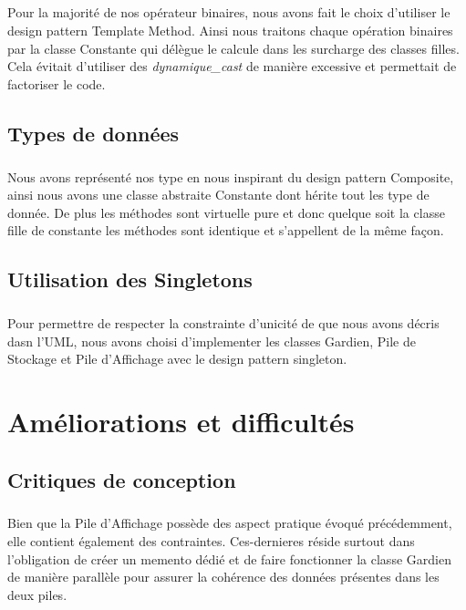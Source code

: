 \documentclass[a4paper,12pt]{report}
\begin{document}
			\paragraph{}Pour la majorité de nos opérateur binaires, nous avons fait le choix d'utiliser le design pattern Template Method. Ainsi nous traitons chaque opération binaires par la classe Constante qui délègue le calcule dans les surcharge des classes filles. Cela évitait d’utiliser des \emph{dynamique\_cast} de manière excessive et permettait de factoriser le code.

	\section{Types de données}
		\paragraph{}Nous avons représenté nos type en nous inspirant du design pattern Composite, ainsi nous avons une classe abstraite Constante dont hérite tout les type de donnée. De plus les méthodes sont virtuelle pure et donc quelque soit la classe fille de constante les méthodes sont identique et s'appellent de la même façon.
		
	\section{Utilisation des Singletons}
		\paragraph{}Pour permettre de respecter la constrainte d'unicité de que nous avons décris dasn l'UML, nous avons choisi d'implementer les classes Gardien, Pile de Stockage et Pile d'Affichage avec le design pattern singleton.
		
\chapter{Améliorations et difficultés}

	\section{Critiques de conception}
		\paragraph{}Bien que la Pile d'Affichage possède des aspect pratique évoqué précédemment, elle contient également des contraintes. Ces-dernieres réside surtout dans l'obligation de créer un memento dédié et de faire fonctionner la classe Gardien de manière parallèle pour assurer la cohérence des données présentes dans les deux piles.
		
\end{document}
